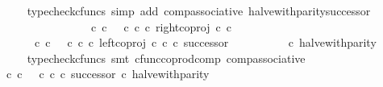 \begin{isabellebody}
\ \ \ \ \ \ \isamarkupfalse%
\ {\isacharparenleft}{\kern0pt}typecheck{\isacharunderscore}{\kern0pt}cfuncs{\isacharcomma}{\kern0pt}\ simp\ add{\isacharcolon}{\kern0pt}\ comp{\isacharunderscore}{\kern0pt}associative{}\ halve{\isacharunderscore}{\kern0pt}with{\isacharunderscore}{\kern0pt}parity{\isacharunderscore}{\kern0pt}successor{\isacharparenright}{\kern0pt}\isanewline
\ \ \ \ \isamarkupfalse%
\ \isamarkupfalse%
\ {\isachardoublequoteopen}{\isachardot}{\kern0pt}{\isachardot}{\kern0pt}{\isachardot}{\kern0pt}\ {\isacharequal}{\kern0pt}\ \isanewline
\ \ \ \ \ \ \ \ {\isacharparenleft}{\kern0pt}{\isacharparenleft}{\kern0pt}{\isacharparenleft}{\kern0pt}{\isasymf}\ {\isasymcirc}\isactrlsub c\ {\isasymbeta}\isactrlbsub {\isasymnat}\isactrlsub c\isactrlesub {\isacharparenright}{\kern0pt}\ {\isasymamalg}\ {\isacharparenleft}{\kern0pt}{\isasymt}\ {\isasymcirc}\isactrlsub c\ {\isasymbeta}\isactrlbsub {\isasymnat}\isactrlsub c\isactrlesub {\isacharparenright}{\kern0pt}\ {\isasymcirc}\isactrlsub c\ right{\isacharunderscore}{\kern0pt}coproj\ {\isasymnat}\isactrlsub c\ {\isasymnat}\isactrlsub c{\isacharparenright}{\kern0pt}\isanewline
\ \ \ \ \ \ \ \ \ \ {\isasymamalg}\ \isanewline
\ \ \ \ \ \ \ \ {\isacharparenleft}{\kern0pt}{\isacharparenleft}{\kern0pt}{\isasymf}\ {\isasymcirc}\isactrlsub c\ {\isasymbeta}\isactrlbsub {\isasymnat}\isactrlsub c\isactrlesub {\isacharparenright}{\kern0pt}\ {\isasymamalg}\ {\isacharparenleft}{\kern0pt}{\isasymt}\ {\isasymcirc}\isactrlsub c\ {\isasymbeta}\isactrlbsub {\isasymnat}\isactrlsub c\isactrlesub {\isacharparenright}{\kern0pt}\ {\isasymcirc}\isactrlsub c\ left{\isacharunderscore}{\kern0pt}coproj\ {\isasymnat}\isactrlsub c\ {\isasymnat}\isactrlsub c\ {\isasymcirc}\isactrlsub c\ successor{\isacharparenright}{\kern0pt}{\isacharparenright}{\kern0pt}\isanewline
\ \ \ \ \ \ \ \ \ \ {\isasymcirc}\isactrlsub c\ halve{\isacharunderscore}{\kern0pt}with{\isacharunderscore}{\kern0pt}parity{\isachardoublequoteclose}\isanewline
\ \ \ \ \ \ \isamarkupfalse%
\ {\isacharparenleft}{\kern0pt}typecheck{\isacharunderscore}{\kern0pt}cfuncs{\isacharcomma}{\kern0pt}\ smt\ cfunc{\isacharunderscore}{\kern0pt}coprod{\isacharunderscore}{\kern0pt}comp\ comp{\isacharunderscore}{\kern0pt}associative{}{\isacharparenright}{\kern0pt}\isanewline
\ \ \ \ \isamarkupfalse%
\ \isamarkupfalse%
\ {\isachardoublequoteopen}{\isachardot}{\kern0pt}{\isachardot}{\kern0pt}{\isachardot}{\kern0pt}\ {\isacharequal}{\kern0pt}\ {\isacharparenleft}{\kern0pt}{\isacharparenleft}{\kern0pt}{\isasymt}\ {\isasymcirc}\isactrlsub c\ {\isasymbeta}\isactrlbsub {\isasymnat}\isactrlsub c\isactrlesub {\isacharparenright}{\kern0pt}\ {\isasymamalg}\ {\isacharparenleft}{\kern0pt}{\isasymf}\ {\isasymcirc}\isactrlsub c\ {\isasymbeta}\isactrlbsub {\isasymnat}\isactrlsub c\isactrlesub \ {\isasymcirc}\isactrlsub c\ successor{\isacharparenright}{\kern0pt}{\isacharparenright}{\kern0pt}\ {\isasymcirc}\isactrlsub c\ halve{\isacharunderscore}{\kern0pt}with{\isacharunderscore}{\kern0pt}parity{\isachardoublequoteclose}\isanewline

\end{isabellebody}
